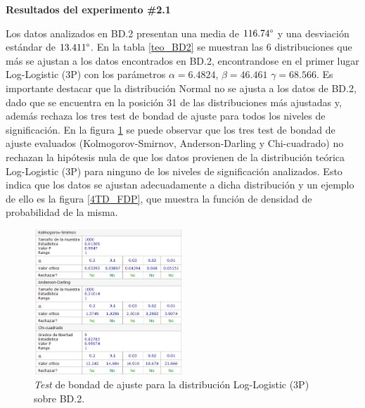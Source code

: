 \documentclass[12pt]{report}
\begin{document}
\textbf{Resultados del experimento \#2.1}

Los datos analizados en BD.2 presentan una media de $116.74\degree$ y una desviación estándar de $13.411\degree$.
En la tabla \ref{teo_BD2}  se muestran las 6 distribuciones que más se ajustan a los datos encontrados en BD.2, encontrandose en el primer lugar Log-Logistic (3P) con los parámetros $\alpha=6.4824$, $\beta=46.461$ $\gamma=68.566$. Es importante destacar que la distribución Normal no se ajusta a los datos de BD.2, dado que se encuentra en la posición 31 de las distribuciones más ajustadas y, además rechaza los tres test de bondad de ajuste para todos los niveles de significación. En la figura \ref{4TD_BONDAD} se puede observar que los tres test de bondad de ajuste evaluados (Kolmogorov-Smirnov, Anderson-Darling y Chi-cuadrado) no rechazan la hipótesis nula de que los datos provienen de la distribución teórica Log-Logistic (3P) para ninguno de los niveles de significación analizados. Esto indica que los datos se ajustan adecuadamente a dicha distribución y un ejemplo de ello es la figura \ref{4TD_FDP}, que muestra la función de densidad de probabilidad de la misma. 
\begin{figure}[ht]
	\centering
	
	\includegraphics[width=0.5\textwidth]{4td_bondad.png}
	\caption{\textit{Test} de bondad de ajuste para la distribución Log-Logistic (3P) sobre BD.2.}
	\label{4TD_BONDAD}
\end{figure}




\end{document}
